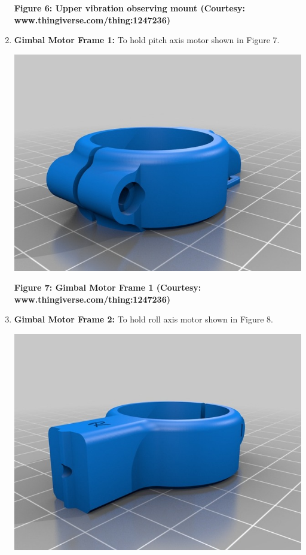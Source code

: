 \documentclass[11pt,a4paper]{article}
\begin{document}
\begin{enumerate}
\begin{center}
			\end{center}
			\begin{center}
				\textbf{Figure 6: Upper vibration observing mount (Courtesy: www.thingiverse.com/thing:1247236)}
			\end{center}
			\item \textbf{Gimbal Motor Frame 1:} To hold pitch axis motor shown in Figure 7.
			\begin{center}
				\includegraphics[scale=0.5]{../Images/Gimbal_Motor_Frame_1.jpg}
			\end{center}
			\begin{center}
				\textbf{Figure 7: Gimbal Motor Frame 1 (Courtesy: www.thingiverse.com/thing:1247236)}
			\end{center}
			\item \textbf{Gimbal Motor Frame 2:} To hold roll axis motor shown in Figure 8.
			\begin{center}
				\includegraphics[scale=0.5]{../Images/Gimbal_Motor_Frame_2.jpg}

\end{center}
\end{enumerate}
\end{document}
